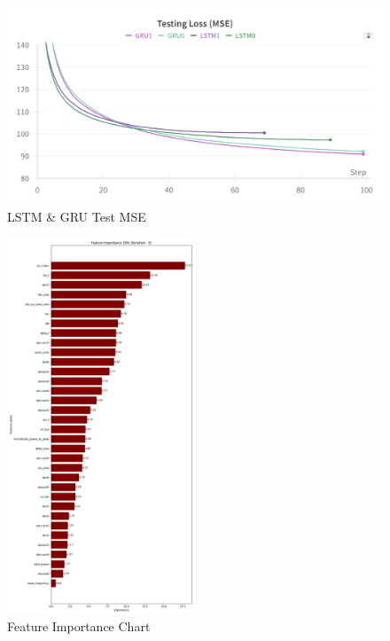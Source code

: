 \begin{figure}[h]
    \centering
    \includegraphics[width=0.4\linewidth]{images/results/LSTM_GRU_Test_mse}
    \caption{LSTM \& GRU Test MSE}
    \label{fig:test_mse}
\end{figure}

\begin{figure}[h]
    \centering
    \includegraphics[width=0.5\textwidth]{images/results/feature_importance_plot_GRU_0}
    \caption{Feature Importance Chart}
    \label{fig:feat_importance}
\end{figure}
